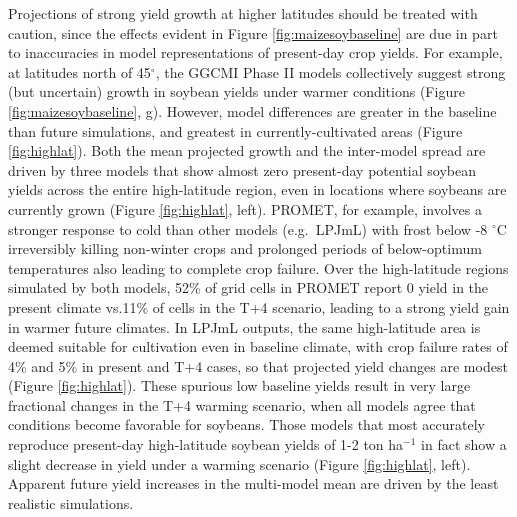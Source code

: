 \documentclass[gmd, manuscript]{copernicus} %
\providecommand{\DIFadd}[1]{{\protect\color{blue}\uwave{#1}}} %
\providecommand{\DIFaddbegin}{} %
\providecommand{\DIFaddend}{} %
\begin{document}
Projections of strong yield growth at higher latitudes should be treated with caution, since the effects evident in Figure \ref{fig:maizesoybaseline} are due in part to inaccuracies in model representations of present-day crop yields. 
For example, at latitudes north of 45$^\circ$, the GGCMI Phase II models collectively suggest strong (but uncertain) growth in soybean yields under warmer conditions (Figure \ref{fig:maizesoybaseline}, g). 
However, model differences are greater in the baseline than future simulations, and greatest in currently-cultivated areas (Figure \ref{fig:highlat}). 
Both the mean projected growth and the inter-model spread are driven by three models that show almost zero present-day potential soybean yields across the entire high-latitude region, even in locations where soybeans are currently grown (Figure \ref{fig:highlat}, left).
PROMET, for example, involves a stronger response to cold than other models (e.g.\ LPJmL) with frost below -8 $^\circ$C irreversibly killing non-winter crops and prolonged periods of below-optimum temperatures also leading to complete crop failure. 
Over the high-latitude regions simulated by both models, 52\% of grid cells in PROMET report 0 yield in the present climate vs.\DIFaddbegin \DIFadd{\ 
}\DIFaddend 11\% of cells in the T+4 scenario, leading to a strong yield gain in warmer future climates. 
In LPJmL outputs, the same high-latitude area is deemed suitable for cultivation even in baseline climate, with crop failure rates of 4\% and 5\% in present and T+4 cases, so that projected yield changes are modest (Figure \ref{fig:highlat}).
These spurious low baseline yields result in very large fractional changes in the T+4 warming scenario, when all models agree that conditions become favorable for soybeans. 
Those models that most accurately reproduce present-day high-latitude soybean yields of 1-2 ton ha$^{-1}$ \citep{Ray2012} in fact show a slight decrease in yield under a warming scenario (Figure \ref{fig:highlat}, left). 
Apparent future yield increases in the multi-model mean are driven by the least realistic simulations.
\end{document}
